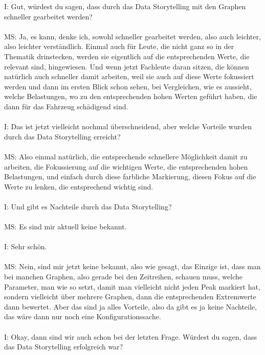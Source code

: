 \begin{linenumbers}
I: Gut, würdest du sagen, dass durch das Data Storytelling mit den Graphen schneller gearbeitet werden?\\\\
MS: Ja, es kann, denke ich, sowohl schneller gearbeitet werden, also auch leichter, also leichter verständlich. Einmal auch für Leute, die nicht ganz so in der Thematik drinstecken, werden sie eigentlich auf die entsprechenden Werte, die relevant sind, hingewiesen. Und wenn jetzt Fachleute daran sitzen, die können natürlich auch schneller damit arbeiten, weil sie auch auf diese Werte fokussiert werden und dann im ersten Blick schon sehen, bei Vergleichen, wie es aussieht, welche Belastungen, wo zu den entsprechenden hohen Werten geführt haben, die dann für das Fahrzeug schädigend sind.\\\\
I: Das ist jetzt vielleicht nochmal überschneidend, aber welche Vorteile wurden durch das Data Storytelling erreicht?\\\\
MS: Also einmal natürlich, die entsprechende schnellere Möglichkeit damit zu arbeiten,  die Fokussierung auf die wichtigen Werte, die entsprechenden hohen Belastungen, und einfach durch diese farbliche Markierung, diesen Fokus auf die Werte zu lenken, die entsprechend wichtig sind.\\\\
I: Und gibt es Nachteile durch das Data Storytelling?\\\\
MS: Es sind mir aktuell keine bekannt.\\\\
I: Sehr schön.\\\\
MS: Nein, sind mir jetzt keine bekannt, also wie gesagt, das Einzige ist, dass man bei manchen Graphen, also gerade bei den Zeitreihen, schauen muss, welche Parameter, man wie so setzt, damit man vielleicht nicht jeden Peak markiert hat, sondern vielleicht über mehrere Graphen, dann die entsprechenden Extremwerte dann bewertet. Aber das sind ja alles Vorteile, also da gibt es ja keine Nachteile, das wäre dann nur noch eine Konfigurationssache.\\\\
I: Okay, dann sind wir auch schon bei der letzten Frage. Würdest du sagen, dass das Data Storytelling erfolgreich war?\\\\

\end{linenumbers}
